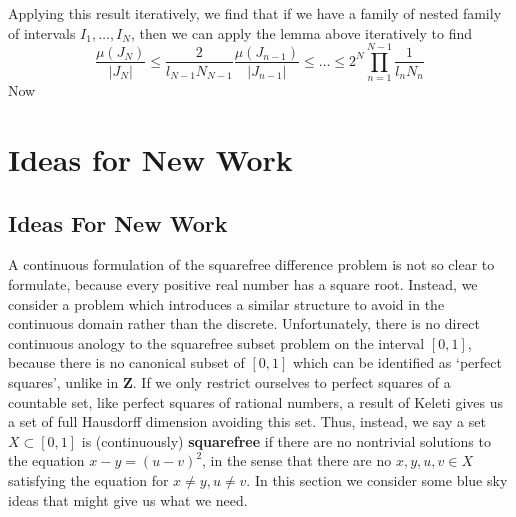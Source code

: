 \documentclass{report}
\theoremstyle{plain}
\theoremstyle{plain}
\begin{document}
Applying this result iteratively, we find that if we have a family of nested family of intervals $I_1, \dots, I_N$, then we can apply the lemma above iteratively to find
%
\[ \frac{\mu(J_N)}{|J_N|} \leq \frac{2}{l_{N-1} N_{N-1}} \frac{\mu(J_{n-1})}{|J_{n-1}|} \leq \dots \leq 2^N \prod_{n = 1}^{N-1} \frac{1}{l_nN_n} \]
%
Now












\chapter{Ideas for New Work}

\section{Ideas For New Work}

A continuous formulation of the squarefree difference problem is not so clear to formulate, because every positive real number has a square root. Instead, we consider a problem which introduces a similar structure to avoid in the continuous domain rather than the discrete. Unfortunately, there is no direct continuous anology to the squarefree subset problem on the interval $[0,1]$, because there is no canonical subset of $[0,1]$ which can be identified as `perfect squares', unlike in $\mathbf{Z}$. If we only restrict ourselves to perfect squares of a countable set, like perfect squares of rational numbers, a result of Keleti gives us a set of full Hausdorff dimension avoiding this set. Thus, instead, we say a set $X \subset [0,1]$ is (continuously) {\bf squarefree} if there are no nontrivial solutions to the equation $x - y = (u - v)^2$, in the sense that there are no $x,y,u,v \in X$ satisfying the equation for $x \neq y, u \neq v$. In this section we consider some blue sky ideas that might give us what we need.
\end{document}
